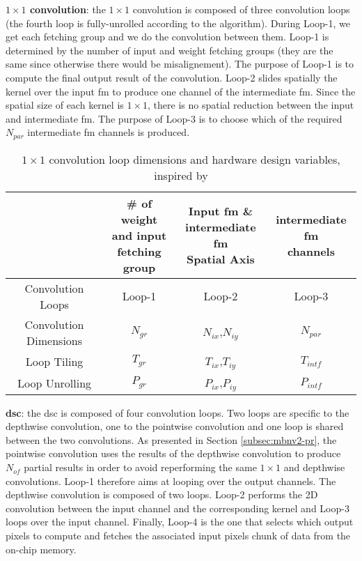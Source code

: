 \textbf{$1 \times 1$ convolution}: the $1 \times 1$ convolution is composed of three convolution loops (the fourth loop is fully-unrolled according to the algorithm). During Loop-1, we get each fetching group and we do the convolution between them. Loop-1 is determined by the number of input and weight fetching groups (they are the same since otherwise there would be misalignement). The purpose of Loop-1 is to compute the final output result of the convolution. Loop-2 slides spatially the kernel over the input \acrshort{fm} to produce one channel of the intermediate \acrshort{fm}. Since the spatial size of each kernel is $1 \times 1$, there is no spatial reduction between the input and intermediate \acrshort{fm}. The purpose of Loop-3 is to choose which of the required $N_{par}$ intermediate \acrshort{fm} channels is produced.
%
\begin{table}[H]
    \centering
    \begin{tabular}{c|c|c|c}
    \hline \hline
    & \makecell{\# of weight \\ and input \\ fetching group} & \makecell{Input \acrshort{fm} \& \\ intermediate \acrshort{fm} \\ Spatial Axis} & \makecell{intermediate \acrshort{fm} \\ channels} \\
    \hline
    Convolution Loops & Loop-1 & Loop-2 & Loop-3 \\
    Convolution Dimensions & $N_{gr}$ & $N_{ix}$,$N_{iy}$ & $N_{par}$ \\
    Loop Tiling            & $T_{gr}$ & $T_{ix}$,$T_{iy}$ & $T_{intf}$ \\
    Loop Unrolling         & $P_{gr}$ & $P_{ix}$,$P_{iy}$ & $P_{intf}$ \\
    \hline \hline
    \end{tabular}
    \caption{$1 \times 1$ convolution loop dimensions and hardware design variables, inspired by \cite{ma_optimizing_2018}}
    \label{tab:param_c11}
\end{table}
%
\textbf{\acrshort{dsc}}: the \acrshort{dsc} is composed of four convolution loops. Two loops are specific to the depthwise convolution, one to the pointwise convolution and one loop is shared between the two convolutions. As presented in Section \ref{subsec:mbnv2-pr}, the pointwise convolution uses the results of the depthwise convolution to produce $N_{of}$ partial results in order to avoid reperforming the same $1 \times 1$ and depthwise convolutions. Loop-1 therefore aims at looping over the output channels. The depthwise convolution is composed of two loops. Loop-2 performs the 2D convolution between the input channel and the corresponding kernel and Loop-3 loops over the input channel. Finally, Loop-4 is the one that selects which output pixels to compute and fetches the associated input pixels chunk of data from the on-chip memory.
